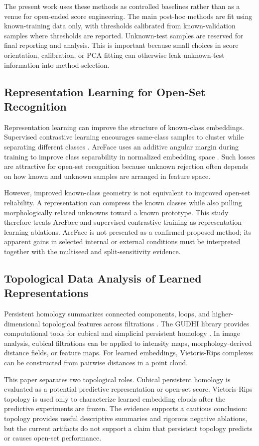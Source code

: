 The present work uses these methods as controlled baselines rather than as a venue for open-ended score engineering. The main post-hoc methods are fit using known-training data only, with thresholds calibrated from known-validation samples where thresholds are reported. Unknown-test samples are reserved for final reporting and analysis. This is important because small choices in score orientation, calibration, or PCA fitting can otherwise leak unknown-test information into method selection.

\subsection{Representation Learning for Open-Set Recognition}

Representation learning can improve the structure of known-class embeddings. Supervised contrastive learning encourages same-class samples to cluster while separating different classes \cite{khosla2020supcon}. ArcFace uses an additive angular margin during training to improve class separability in normalized embedding space \cite{deng2019arcface}. Such losses are attractive for open-set recognition because unknown rejection often depends on how known and unknown samples are arranged in feature space.

However, improved known-class geometry is not equivalent to improved open-set reliability. A representation can compress the known classes while also pulling morphologically related unknowns toward a known prototype. This study therefore treats ArcFace and supervised contrastive training as representation-learning ablations. ArcFace is not presented as a confirmed proposed method; its apparent gains in selected internal or external conditions must be interpreted together with the multiseed and split-sensitivity evidence.

\subsection{Topological Data Analysis of Learned Representations}

Persistent homology summarizes connected components, loops, and higher-dimensional topological features across filtrations \cite{edelsbrunner2002persistence,carlsson2009topology}. The GUDHI library provides computational tools for cubical and simplicial persistent homology \cite{maria2014gudhi}. In image analysis, cubical filtrations can be applied to intensity maps, morphology-derived distance fields, or feature maps. For learned embeddings, Vietoris-Rips complexes can be constructed from pairwise distances in a point cloud.

This paper separates two topological roles. Cubical persistent homology is evaluated as a potential predictive representation or open-set score. Vietoris-Rips topology is used only to characterize learned embedding clouds after the predictive experiments are frozen. The evidence supports a cautious conclusion: topology provides useful descriptive summaries and rigorous negative ablations, but the current artifacts do not support a claim that persistent topology predicts or causes open-set performance.
